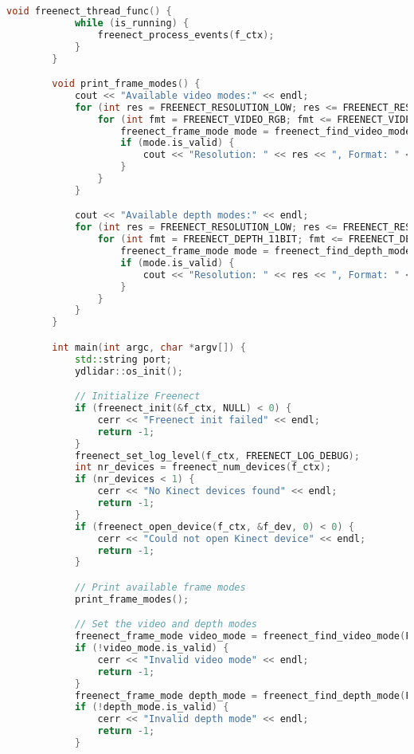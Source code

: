 \begin{lstlisting}[language={C++}, caption={C\'odigo de ejemplo de Kinect y LiDAR}, label={fresd}]
        void freenect_thread_func() {
            while (is_running) {
                freenect_process_events(f_ctx);
            }
        }

        void print_frame_modes() {
            cout << "Available video modes:" << endl;
            for (int res = FREENECT_RESOLUTION_LOW; res <= FREENECT_RESOLUTION_HIGH; ++res) {
                for (int fmt = FREENECT_VIDEO_RGB; fmt <= FREENECT_VIDEO_IR_8BIT; ++fmt) {
                    freenect_frame_mode mode = freenect_find_video_mode((freenect_resolution)res, (freenect_video_format)fmt);
                    if (mode.is_valid) {
                        cout << "Resolution: " << res << ", Format: " << fmt << ", Width: " << mode.width << ", Height: " << mode.height << ", Bytes per pixel: " << mode.data_bits_per_pixel << endl;
                    }
                }
            }

            cout << "Available depth modes:" << endl;
            for (int res = FREENECT_RESOLUTION_LOW; res <= FREENECT_RESOLUTION_HIGH; ++res) {
                for (int fmt = FREENECT_DEPTH_11BIT; fmt <= FREENECT_DEPTH_REGISTERED; ++fmt) {
                    freenect_frame_mode mode = freenect_find_depth_mode((freenect_resolution)res, (freenect_depth_format)fmt);
                    if (mode.is_valid) {
                        cout << "Resolution: " << res << ", Format: " << fmt << ", Width: " << mode.width << ", Height: " << mode.height << ", Bytes per pixel: " << mode.data_bits_per_pixel << endl;
                    }
                }
            }
        }

        int main(int argc, char *argv[]) {
            std::string port;
            ydlidar::os_init();

            // Initialize Freenect
            if (freenect_init(&f_ctx, NULL) < 0) {
                cerr << "Freenect init failed" << endl;
                return -1;
            }
            freenect_set_log_level(f_ctx, FREENECT_LOG_DEBUG);
            int nr_devices = freenect_num_devices(f_ctx);
            if (nr_devices < 1) {
                cerr << "No Kinect devices found" << endl;
                return -1;
            }
            if (freenect_open_device(f_ctx, &f_dev, 0) < 0) {
                cerr << "Could not open Kinect device" << endl;
                return -1;
            }

            // Print available frame modes
            print_frame_modes();

            // Set the video and depth modes
            freenect_frame_mode video_mode = freenect_find_video_mode(FREENECT_RESOLUTION_MEDIUM, FREENECT_VIDEO_RGB);
            if (!video_mode.is_valid) {
                cerr << "Invalid video mode" << endl;
                return -1;
            }
            freenect_frame_mode depth_mode = freenect_find_depth_mode(FREENECT_RESOLUTION_MEDIUM, FREENECT_DEPTH_11BIT);
            if (!depth_mode.is_valid) {
                cerr << "Invalid depth mode" << endl;
                return -1;
            }


\end{lstlisting}
